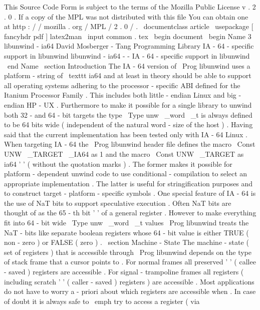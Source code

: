 %
This
Source
Code
Form
is
subject
to
the
terms
of
the
Mozilla
Public
%
License
v
.
2
.
0
.
If
a
copy
of
the
MPL
was
not
distributed
with
this
%
file
You
can
obtain
one
at
http
:
/
/
mozilla
.
org
/
MPL
/
2
.
0
/
.
\
documentclass
{
article
}
\
usepackage
[
fancyhdr
pdf
]
{
latex2man
}
\
input
{
common
.
tex
}
\
begin
{
document
}
\
begin
{
Name
}
{
3
}
{
libunwind
-
ia64
}
{
David
Mosberger
-
Tang
}
{
Programming
Library
}
{
IA
-
64
-
specific
support
in
libunwind
}
libunwind
-
ia64
-
-
IA
-
64
-
specific
support
in
libunwind
\
end
{
Name
}
\
section
{
Introduction
}
The
IA
-
64
version
of
\
Prog
{
libunwind
}
uses
a
platform
-
string
of
\
texttt
{
ia64
}
and
at
least
in
theory
should
be
able
to
support
all
operating
systems
adhering
to
the
processor
-
specific
ABI
defined
for
the
Itanium
Processor
Family
.
This
includes
both
little
-
endian
Linux
and
big
-
endian
HP
-
UX
.
Furthermore
to
make
it
possible
for
a
single
library
to
unwind
both
32
-
and
64
-
bit
targets
the
type
\
Type
{
unw
\
_word
\
_t
}
is
always
defined
to
be
64
bits
wide
(
independent
of
the
natural
word
-
size
of
the
host
)
.
Having
said
that
the
current
implementation
has
been
tested
only
with
IA
-
64
Linux
.
When
targeting
IA
-
64
the
\
Prog
{
libunwind
}
header
file
defines
the
macro
\
Const
{
UNW
\
_TARGET
\
_IA64
}
as
1
and
the
macro
\
Const
{
UNW
\
_TARGET
}
as
ia64
'
'
(
without
the
quotation
marks
)
.
The
former
makes
it
possible
for
platform
-
dependent
unwind
code
to
use
conditional
-
compilation
to
select
an
appropriate
implementation
.
The
latter
is
useful
for
stringification
purposes
and
to
construct
target
-
platform
-
specific
symbols
.
One
special
feature
of
IA
-
64
is
the
use
of
NaT
bits
to
support
speculative
execution
.
Often
NaT
bits
are
thought
of
as
the
65
-
th
bit
'
'
of
a
general
register
.
However
to
make
everything
fit
into
64
-
bit
wide
\
Type
{
unw
\
_word
\
_t
}
values
\
Prog
{
libunwind
}
treats
the
NaT
-
bits
like
separate
boolean
registers
whose
64
-
bit
value
is
either
TRUE
(
non
-
zero
)
or
FALSE
(
zero
)
.
\
section
{
Machine
-
State
}
The
machine
-
state
(
set
of
registers
)
that
is
accessible
through
\
Prog
{
libunwind
}
depends
on
the
type
of
stack
frame
that
a
cursor
points
to
.
For
normal
frames
all
preserved
'
'
(
callee
-
saved
)
registers
are
accessible
.
For
signal
-
trampoline
frames
all
registers
(
including
scratch
'
'
(
caller
-
saved
)
registers
)
are
accessible
.
Most
applications
do
not
have
to
worry
a
-
priori
about
which
registers
are
accessible
when
.
In
case
of
doubt
it
is
always
safe
to
\
emph
{
try
}
to
access
a
register
(
via
\
